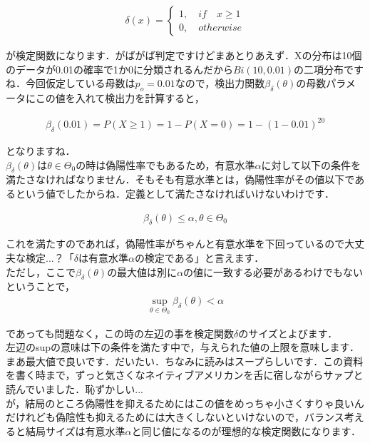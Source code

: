\documentclass[11pt,a4paper]{ujreport} 	%
\begin{document}
\begin{align}
  \delta(x) = 
  \left\{
    \begin{array}{l}
    1, \quad if \quad  x \geq 1\\
    0, \quad otherwise
    \end{array}
  \right.
\end{align}

が検定関数になります．がばがば判定ですけどまあとりあえず．Xの分布は10個のデータが0.01の確率で1か0に分類されるんだから$Bi(10,0.01)$の二項分布ですね．今回仮定している母数は$p_o = 0.01$なので，検出力関数$\beta_\delta(\theta)$の母数パラメータにこの値を入れて検出力を計算すると，

\begin{align}
  \beta_\delta(0.01) = P(X \geq 1) = 1-P(X=0) = 1-(1-0.01)^{20}
  \label{eq:size}
\end{align}

となりますね．\\

$\beta_\delta(\theta)$は$\theta \in \Theta_0$の時は偽陽性率でもあるため，有意水準$\alpha$に対して以下の条件を満たさなければなりません．そもそも有意水準とは，偽陽性率がその値以下であるという値でしたからね．定義として満たさなければいけないわけです．

\begin{align}
  \beta_\delta(\theta) \leq \alpha, \theta \in \Theta_0
  \label{eq:power}
\end{align}

これを満たすのであれば，偽陽性率がちゃんと有意水準を下回っているので大丈夫な検定...？「$\delta$は有意水準$\alpha$の検定である」と言えます．\\

ただし，ここで$\beta_\delta(\theta)$の最大値は別に$\alpha$の値に一致する必要があるわけでもないということで，
\begin{align}
\displaystyle \sup_{\theta \in\Theta_0} \beta_\delta(\theta) < \alpha
\end{align}

であっても問題なく，この時の左辺の事を検定関数$\delta$のサイズとよびます．\\

左辺のsupの意味は下の条件を満たす中で，与えられた値の上限を意味します．まあ最大値で良いです．だいたい．ちなみに読みはスープらしいです．この資料を書く時まで，ずっと気さくなネイティブアメリカンを舌に宿しながらサァプと読んでいました．恥ずかしい...\\

が，結局のところ偽陽性を抑えるためにはこの値をめっちゃ小さくすりゃ良いんだけれども偽陰性も抑えるためには大きくしないといけないので，バランス考えると結局サイズは有意水準$\alpha$と同じ値になるのが理想的な検定関数になります．\\
\\
\end{document}
